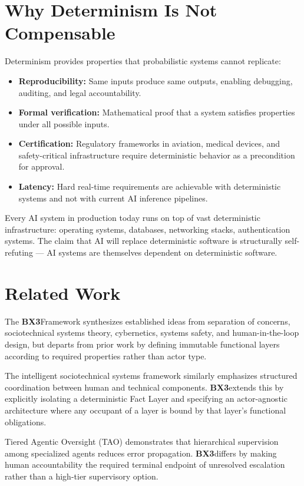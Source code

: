 \documentclass[12pt]{article}
\newcommand{\bxthree}{\textbf{BX3}}
\begin{document}
\section{Why Determinism Is Not Compensable}
\label{sec:determinism}

Determinism provides properties that probabilistic systems cannot replicate:

\begin{itemize}[noitemsep]
\item \textbf{Reproducibility:} Same inputs produce same outputs, enabling debugging, auditing, and legal accountability.
\item \textbf{Formal verification:} Mathematical proof that a system satisfies properties under all possible inputs.
\item \textbf{Certification:} Regulatory frameworks in aviation, medical devices, and safety-critical infrastructure require deterministic behavior as a precondition for approval.
\item \textbf{Latency:} Hard real-time requirements are achievable with deterministic systems and not with current AI inference pipelines.
\end{itemize}

Every AI system in production today runs on top of vast deterministic infrastructure: operating systems, databases, networking stacks, authentication systems. The claim that AI will replace deterministic software is structurally self-refuting --- AI systems are themselves dependent on deterministic software.

\section{Related Work}
\label{sec:prior}

The \bxthree Framework synthesizes established ideas from separation of concerns, sociotechnical systems theory, cybernetics, systems safety, and human-in-the-loop design, but departs from prior work by defining immutable functional layers according to required properties rather than actor type.

The intelligent sociotechnical systems framework \cite{xu2024} similarly emphasizes structured coordination between human and technical components. \bxthree extends this by explicitly isolating a deterministic Fact Layer and specifying an actor-agnostic architecture where any occupant of a layer is bound by that layer's functional obligations.

Tiered Agentic Oversight (TAO) \cite{kim2025tao} demonstrates that hierarchical supervision among specialized agents reduces error propagation. \bxthree differs by making human accountability the required terminal endpoint of unresolved escalation rather than a high-tier supervisory option.
\end{document}
